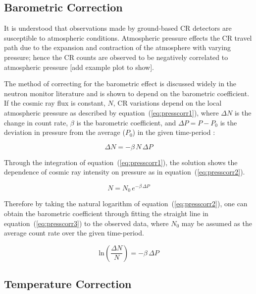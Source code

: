 \subsection{Barometric Correction}\label{sec:HS_P_corr}

It is understood that observations made by ground-based CR detectors are susceptible to atmospheric conditions. Atmospheric pressure effects the CR travel path due to the expansion and contraction of the atmosphere with varying pressure; hence the CR counts are observed to be negatively correlated to atmospheric pressure [add example plot to show].

The method of correcting for the barometric effect is discussed widely in the neutron monitor literature and is shown to depend on the barometric coefficient. If the cosmic ray flux is constant, $N$, CR variations depend on the local atmospheric pressure as described by equation~(\ref{eq:presscorr1}), where $\Delta N$ is the change in count rate, $\beta$ is the barometric coefficient, and $\Delta P = P - P_0$ is the deviation in pressure from the average ($P_0$) in the given time-period \citep{paschalis_online_2013}:

\begin{equation}
\Delta N = - \beta \, N \, \Delta P
\label{eq:presscorr1}
\end{equation}

Through the integration of equation~(\ref{eq:presscorr1}), the solution shows the dependence of cosmic ray intensity on pressure as in equation~(\ref{eq:presscorr2}). 

\begin{equation}
N = N_{0} \, e^{-\beta \, \Delta P}
\label{eq:presscorr2}
\end{equation}

Therefore by taking the natural logarithm of equation~(\ref{eq:presscorr2}), one can obtain the barometric coefficient through fitting the straight line in equation~(\ref{eq:presscorr3}) to the observed data, where $N_0$ may be assumed as the average count rate over the given time-period. 

\begin{equation}
\mathrm{ln} \left( \frac{\Delta N}{N} \right) = - \beta \, \Delta P
\label{eq:presscorr3}
\end{equation}


\subsection{Temperature Correction}\label{sec:HS_T_corr}





